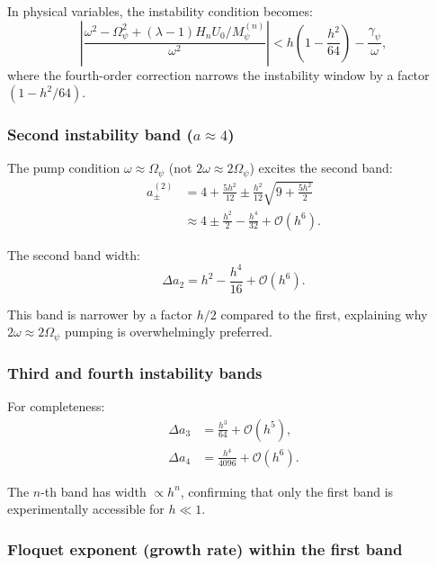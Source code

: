 \documentclass[12pt,aps,prd,twocolumn,superscriptaddress,nofootinbib]{revtex4-2}
\newcommand{\Opsi}{\Omega_\psi}
\newcommand{\gpsi}{\gamma_\psi}
\newcommand{\Mpsi}{M_\psi}
\begin{document}
In physical variables, the instability condition becomes:
\begin{equation}
\left|\frac{\omega^2 - \Opsi^2 + (\lambda-1)H_n U_0/\Mpsi^{(n)}}
{\omega^2}\right|
< h\left(1 - \frac{h^2}{64}\right) - \frac{\gpsi}{\omega},
\label{eq:instability_physical}
\end{equation}
where the fourth-order correction narrows the instability window
by a factor $(1 - h^2/64)$.

\subsubsection{Second instability band ($a \approx 4$)}

The pump condition $\omega \approx \Opsi$ (not $2\omega \approx 2\Opsi$)
excites the second band:
\begin{align}
a_\pm^{(2)} &= 4 + \frac{5h^2}{12}
\pm \frac{h^2}{12}\sqrt{9 + \frac{5h^2}{2}}
\nonumber\\
&\approx 4 \pm \frac{h^2}{2} - \frac{h^4}{32}
+ \mathcal{O}(h^6).
\label{eq:band2}
\end{align}

The second band width:
\begin{equation}
\Delta a_2 = h^2 - \frac{h^4}{16} + \mathcal{O}(h^6).
\label{eq:width2}
\end{equation}

This band is narrower by a factor $h/2$ compared to the first,
explaining why $2\omega \approx 2\Opsi$ pumping is overwhelmingly
preferred.

\subsubsection{Third and fourth instability bands}

For completeness:
\begin{align}
\Delta a_3 &= \frac{h^3}{64} + \mathcal{O}(h^5),
\label{eq:width3}\\
\Delta a_4 &= \frac{h^4}{4096} + \mathcal{O}(h^6).
\label{eq:width4}
\end{align}

The $n$-th band has width $\propto h^n$, confirming that only the
first band is experimentally accessible for $h \ll 1$.

\subsubsection{Floquet exponent (growth rate) within the first band}
\end{document}
